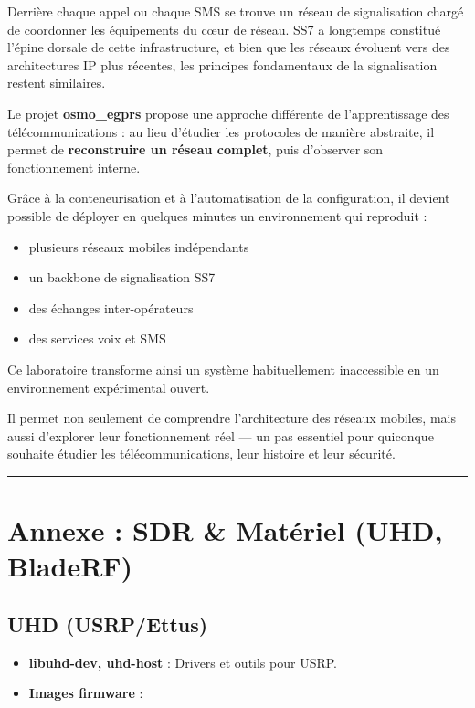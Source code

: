 \documentclass[
  french,
]{article}
\providecommand{\tightlist}{%
  \setlength{\itemsep}{0pt}\setlength{\parskip}{0pt}}
\begin{document}
Derrière chaque appel ou chaque SMS se trouve un réseau de signalisation
chargé de coordonner les équipements du cœur de réseau. SS7 a longtemps
constitué l'épine dorsale de cette infrastructure, et bien que les
réseaux évoluent vers des architectures IP plus récentes, les principes
fondamentaux de la signalisation restent similaires.

Le projet \textbf{osmo\_egprs} propose une approche différente de
l'apprentissage des télécommunications : au lieu d'étudier les
protocoles de manière abstraite, il permet de \textbf{reconstruire un
réseau complet}, puis d'observer son fonctionnement interne.

Grâce à la conteneurisation et à l'automatisation de la configuration,
il devient possible de déployer en quelques minutes un environnement qui
reproduit :

\begin{itemize}
\tightlist
\item
  plusieurs réseaux mobiles indépendants
\item
  un backbone de signalisation SS7
\item
  des échanges inter-opérateurs
\item
  des services voix et SMS
\end{itemize}

Ce laboratoire transforme ainsi un système habituellement inaccessible
en un environnement expérimental ouvert.

Il permet non seulement de comprendre l'architecture des réseaux
mobiles, mais aussi d'explorer leur fonctionnement réel --- un pas
essentiel pour quiconque souhaite étudier les télécommunications, leur
histoire et leur sécurité.

\begin{center}\rule{0.5\linewidth}{0.5pt}\end{center}

\section{Annexe : SDR \& Matériel (UHD,
BladeRF)}\label{annexe-sdr-matuxe9riel-uhd-bladerf}

\subsection{UHD (USRP/Ettus)}\label{uhd-usrpettus-1}

\begin{itemize}
\item
  \textbf{libuhd-dev, uhd-host} : Drivers et outils pour USRP.
\item
  \textbf{Images firmware} :
\end{itemize}
\end{document}
